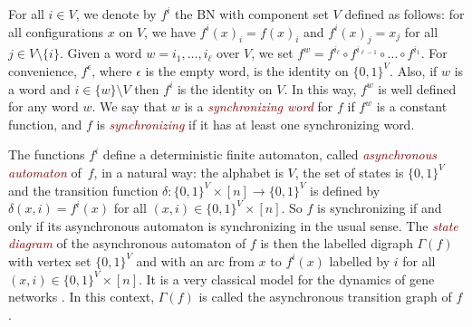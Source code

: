 \documentclass[11pt,letter]{article}
\newcommand{\EM}[1]{{\em\textcolor{Maroon}{#1}}}
\newcommand{\B}{\{0,1\}}
\begin{document}
\medskip
For all $i\in V$, we denote by $f^i$ the BN with component set $V$ defined as follows: for all configurations $x$ on $V$, we have $f^i(x)_i=f(x)_i$ and $f^i(x)_j=x_j$ for all $j\in V\setminus\{i\}$. Given a word $w=i_1,\dots,i_\ell$ over $V$, we set 
$f^w=f^{i_\ell}\circ f^{i_{\ell-1}}\circ\dots\circ f^{i_1}$. For convenience, $f^\epsilon$, where $\epsilon$ is the empty word, is the identity on $\B^V$. Also, if $w$ is a word and $i\in\{w\}\setminus V$ then $f^i$ is the identity on $V$. In this way, $f^w$ is well defined for any word $w$. We say that $w$ is a \EM{synchronizing word} for $f$ if $f^w$ is a constant function, and $f$ is \EM{synchronizing} if it has at least one synchronizing word.

\medskip
The functions $f^i$ define a deterministic finite automaton, called \EM{asynchronous automaton} of~$f$, in a natural way: the alphabet is $V$, the set of states is $\B^V$ and the transition function $\delta:\B^V\times [n]\to\B^V$ is defined by $\delta(x,i)=f^i(x)$ for all $(x,i)\in\B^V\times [n]$. So $f$ is synchronizing if and only if its asynchronous automaton is synchronizing in the usual sense. The \EM{state diagram} of the asynchronous automaton of $f$ is then the labelled digraph $\Gamma(f)$ with vertex set $\B^V$ and with an arc from $x$ to $f^i(x)$ labelled by $i$ for all $(x,i)\in\B^V\times [n]$. It is a very classical model for the dynamics of gene networks \cite{T73,TA90}. In this context, $\Gamma(f)$ is called the asynchronous transition graph of $f$. 
\end{document}
